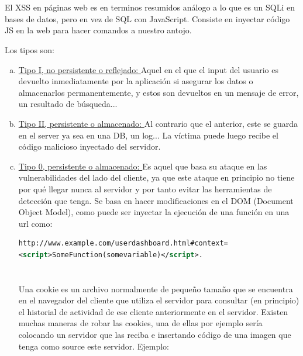 \documentclass[12pt,a4paper,oneside,onecolumn]{article}
\begin{document}
 
    \section{}
    El XSS en p\'aginas web es en terminos resumidos an\'alogo a lo que es un SQLi en bases de datos, pero en vez de SQL con JavaScript. Consiste en inyectar c\'odigo JS en la web para hacer comandos a nuestro antojo.
    
    \newline
    Los tipos son:
    \begin{enumerate}[a)]
        \item
        \underline{Tipo I, no persistente o reflejado: } Aquel en el que el input del usuario es devuelto inmediatamente por la aplicaci\'on si asegurar los datos o almacenarlos permanentemente, y estos son devueltos en un mensaje de error, un resultado de b\'usqueda...
         \item
        \underline{Tipo II, persistente o almacenado: }
        Al contrario que el anterior, este se guarda en el server ya sea en una DB, un log...
        La v\'ictima puede luego recibe el c\'odigo malicioso inyectado del servidor.
        \item
        \underline{Tipo 0, persistente o almacenado: }
        Es aquel que basa su ataque en las vulnerabilidades del lado del cliente, ya que este ataque en principio no tiene por qu\'e llegar nunca al servidor y por tanto evitar las herramientas de detecci\'on que tenga. Se basa en hacer modificaciones en el DOM (Document Object Model), como puede ser inyectar la ejecuci\'on de una funci\'on en una url como:
        \newline
        \begin{lstlisting}[language = xml]
http://www.example.com/userdashboard.html#context=
<script>SomeFunction(somevariable)</script>.
        \end{lstlisting}
        
    \section{}
    Una cookie es un archivo normalmente de peque\~{n}o tama\~{n}o que se encuentra en el navegador del cliente que utiliza el servidor para consultar (en principio) el historial de actividad de ese cliente anteriormente en el servidor. Existen muchas maneras de robar las cookies, una de ellas por ejemplo ser\'ia colocando un servidor que las reciba e insertando c\'odigo de una imagen que tenga como source este servidor. Ejemplo:
    

\end{enumerate}
\end{document}
